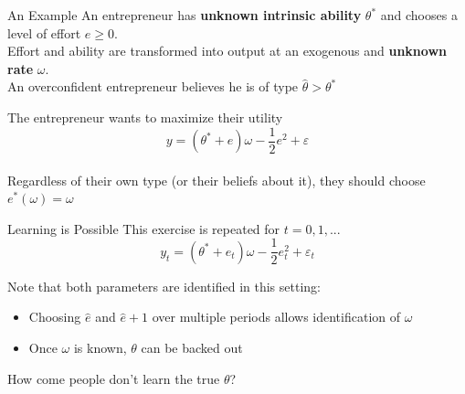 \documentclass[aspectratio=169]{beamer}
\begin{document}
\begin{frame}{An Example}
    An entrepreneur has \textbf{unknown intrinsic ability} $\theta^*$ and chooses a level of effort $e\geq 0.$ \\
    \bigskip
    Effort and ability are transformed into output at an exogenous and \textbf{unknown rate} $\omega.$\\
    \bigskip 
    An overconfident entrepreneur believes he is of type $\hat\theta>\theta^*$\\
    \bigskip
    
    The entrepreneur wants to maximize their utility\\
        $$y = (\theta^* + e)\omega-\frac{1}{2}e^2 +\varepsilon$$\\
    \pause
    \bigskip
    Regardless of their own type (or their beliefs about it), they should choose $e^*(\omega)=\omega$\\
\end{frame}

\begin{frame}{Learning is Possible}
    This exercise is repeated for $t=0, 1, ...$
        $$y_t = (\theta^* + e_t)\omega-\frac{1}{2}e_t^2 +\varepsilon_t$$
    
    Note that both parameters are identified in this setting:\\
    \bigskip
    
    \begin{itemize}
        \item Choosing $\hat{e}$ and $\hat{e}+1$ over multiple periods allows identification of $\omega$\\
        \bigskip
        \item Once $\omega$ is known, $\theta$ can be backed out\\
     \end{itemize}
    \bigskip
    How come people don't learn the true $\theta$?
\end{frame}
\end{document}
